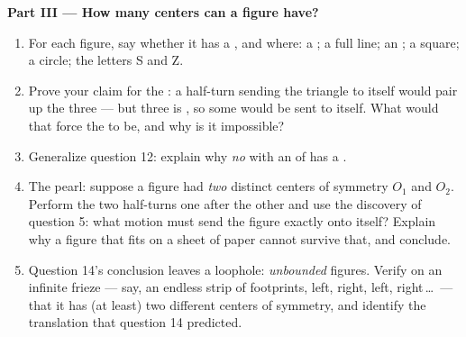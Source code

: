 \begin{problem}
\medskip
\noindent\textbf{Part III --- How many centers can a figure
have?}
\begin{enumerate}[resume]
  \item For each figure, say whether it has a , and where: a ; a full line; an
        ; a square; a circle; the letters S
        and Z.
  \item Prove your claim for the : a
        half-turn sending the triangle to itself would pair up
        the three  --- but three is , so some 
        would be sent to itself. What would that force the
         to be, and why is it impossible?
  \item Generalize question 12: explain why \emph{no} 
        with an  of  has a .
  \item The pearl: suppose a figure had \emph{two} distinct
        centers of symmetry $O_1$ and $O_2$. Perform the two
        half-turns one after the other and use the discovery of
        question 5: what motion must send the figure exactly
        onto itself? Explain why a figure that fits on a sheet
        of paper cannot survive that, and conclude.
  \item Question 14's conclusion leaves a loophole:
        \emph{unbounded} figures. Verify on an infinite frieze
        --- say, an endless strip of footprints, left, right,
        left, right\,\dots\ --- that it has (at least) two
        different centers of symmetry, and identify the
        translation that question 14 predicted.
\end{enumerate}
\end{problem}
